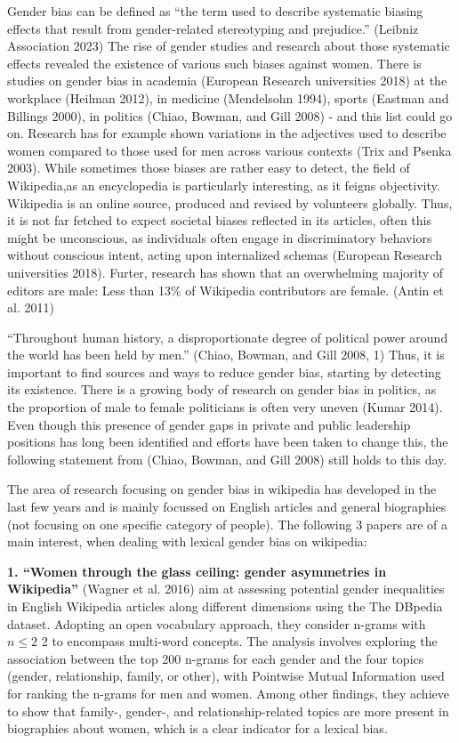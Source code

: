 \documentclass[
]{article}
\begin{document}
Gender bias can be defined as ``the term used to describe systematic
biasing effects that result from gender-related stereotyping and
prejudice.'' (Leibniz Association 2023) The rise of gender studies and
research about those systematic effects revealed the existence of
various such biases against women. There is studies on gender bias in
academia (European Research universities 2018) at the workplace (Heilman
2012), in medicine (Mendelsohn 1994), sports (Eastman and Billings
2000), in politics (Chiao, Bowman, and Gill 2008) - and this list could
go on. Research has for example shown variations in the adjectives used
to describe women compared to those used for men across various contexts
(Trix and Psenka 2003). While sometimes those biases are rather easy to
detect, the field of Wikipedia,as an encyclopedia is particularly
interesting, as it feigns objectivity. Wikipedia is an online source,
produced and revised by volunteers globally. Thus, it is not far fetched
to expect societal biases reflected in its articles, often this might be
unconscious, as individuals often engage in discriminatory behaviors
without conscious intent, acting upon internalized schemas (European
Research universities 2018). Furter, research has shown that an
overwhelming majority of editors are male: Less than 13\% of Wikipedia
contributors are female. (Antin et al. 2011)

``Throughout human history, a disproportionate degree of political power
around the world has been held by men.'' (Chiao, Bowman, and Gill 2008,
1) Thus, it is important to find sources and ways to reduce gender bias,
starting by detecting its existence. There is a growing body of research
on gender bias in politics, as the proportion of male to female
politicians is often very uneven (Kumar 2014). Even though this presence
of gender gaps in private and public leadership positions has long been
identified and efforts have been taken to change this, the following
statement from (Chiao, Bowman, and Gill 2008) still holds to this day.

The area of research focusing on gender bias in wikipedia has developed
in the last few years and is mainly focussed on English articles and
general biographies (not focusing on one specific category of people).
The following 3 papers are of a main interest, when dealing with lexical
gender bias on wikipedia:

\textbf{1. ``Women through the glass ceiling: gender asymmetries in
Wikipedia''} (Wagner et al. 2016) aim at assessing potential gender
inequalities in English Wikipedia articles along different dimensions
using the The DBpedia dataset. Adopting an open vocabulary approach,
they consider n-grams with \(n \leq 2\) 2 to encompass multi-word
concepts. The analysis involves exploring the association between the
top 200 n-grams for each gender and the four topics (gender,
relationship, family, or other), with Pointwise Mutual Information used
for ranking the n-grams for men and women. Among other findings, they
achieve to show that family-, gender-, and relationship-related topics
are more present in biographies about women, which is a clear indicator
for a lexical bias.
\end{document}
